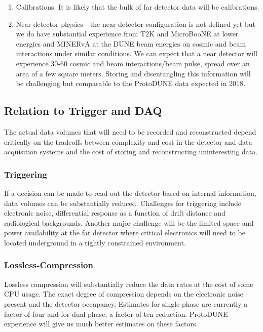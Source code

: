 \begin{enumerate}
\item Calibrations.  It is likely that the bulk of far detector data will be calibrations. 


\item Near detector physics - the near detector configuration is not defined yet but we do have substantial experience from T2K and MicroBooNE at lower energies and MINERvA at the DUNE beam energies on cosmic and beam interactions under similar conditions.  We can expect that a near detector will experience 30-60 cosmic and beam interactions/beam pulse, spread over an area of a few square meters.  Storing and disentangling this information will be challenging but comparable to the ProtoDUNE data expected in 2018.



\end{enumerate}


\subsection{Relation to Trigger and DAQ}

The actual data volumes that will need to be recorded and reconstructed depend critically on the tradeoffs between complexity and cost in the detector and data acquisition systems and the cost of storing and reconstructing uninteresting data.

\subsubsection{Triggering}

If a decision can be made to read  out the detector based on internal information, data volumes can be substantially reduced.  
Challenges for triggering include electronic noise, differential response as a function of drift distance and radiological backgrounds.
Another major challenge will be the limited space and power availability at the far detector where critical electronics will need to be located underground in a tightly constrained environment.

\subsubsection{Lossless-Compression}

Lossless compression will substantially reduce the data rates at the cost of some CPU usage.  The exact degree of compression  depends on the electronic noise present and the detector occupancy.  Estimates for single phase are currently a factor of four and for dual phase, a factor of ten reduction.  ProtoDUNE experience will give us much better estimates on these factors.


